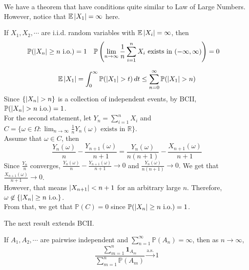 \documentclass{huhtakm-template-book}
\newcommand{\prob}{\mathbb{P}}
\newcommand{\expect}{\mathbb{E}}
\begin{document}
We have a theorem that have conditions quite similar to Law of Large Numbers. However, notice that $\expect\abs{X_{1}}=\infty$ here.
\begin{thm}
	If $X_{1},X_{2},\cdots$ are i.i.d. random variables with $\expect\abs{X_{i}}=\infty$, then
	\begin{align*}
		\prob(\abs{X_{n}}\geq n\text{ i.o.})&=1 & \prob\left(\lim_{n\to\infty}\frac{1}{n}\sum_{i=1}^{n}X_{i}\text{ exists in }(-\infty,\infty)\right)&=0
	\end{align*}
\end{thm}
\begin{proofing}
	\begin{equation*}
		\expect\abs{X_{1}}=\int_{0}^{\infty}\prob(\abs{X_{1}}>t)\,dt\leq\sum_{n=0}^{\infty}\prob(\abs{X_{1}}>n)
	\end{equation*}
	Since $\{\abs{X_{n}}>n\}$ is a collection of independent events, by BCII, $\prob(\abs{X_{n}}>n\text{ i.o.})=1$.\\
	For the second statement, let $Y_{n}=\sum_{i=1}^{n}X_{i}$ and $C=\{\omega\in\Omega:\lim_{n\to\infty}\frac{1}{n}Y_{n}(\omega)\text{ exists in }\mathbb{R}\}$.\\
	Assume that $\omega\in C$, then
	\begin{equation*}
		\frac{Y_{n}(\omega)}{n}-\frac{Y_{n+1}(\omega)}{n+1}=\frac{Y_{n}(\omega)}{n(n+1)}-\frac{X_{n+1}(\omega)}{n+1}
	\end{equation*}
	Since $\frac{Y_{n}}{n}$ converges, $\frac{Y_{n}(\omega)}{n}-\frac{Y_{n+1}(\omega)}{n+1}\to 0$ and $\frac{Y_{n}(\omega)}{n(n+1)}\to 0$. We get that $\frac{X_{n+1}(\omega)}{n+1}\to 0$.\\
	However, that means $\left|{X_{n+1}}\right|<n+1$ for an arbitrary large $n$. Therefore, $\omega\not\in\{\left|{X_{n}}\right|\geq n\text{ i.o.}\}$.\\
	From that, we get that $\prob(C)=0$ since $\prob(\abs{X_{n}}\geq n\text{ i.o.})=1$.
\end{proofing}
\newpage
The next result extends BCII.
\begin{thm}
	If $A_{1},A_{2},\cdots$ are pairwise independent and $\sum_{n=1}^{\infty}\prob(A_{n})=\infty$, then as $n\to\infty$,
	\begin{equation*}
		\frac{\sum_{m=1}^{n}\mathbf{1}_{A_{m}}}{\sum_{m=1}^{n}\prob(A_{m})}\xrightarrow{\text{a.s.}}1
	\end{equation*}
\end{thm}
\end{document}
